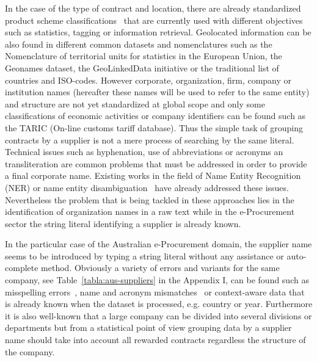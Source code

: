 \documentclass{llncs}
\begin{document}
In the case of the type of contract and location, there are already standardized product 
scheme classifications~\cite{DBLP:journals/ijseke/AlvarezLSASL12,pscsODBook} that are currently used with different objectives 
such as statistics, tagging or information retrieval. Geolocated information can be also found in different common datasets and nomenclatures such as 
the Nomenclature of territorial units for statistics in the European Union, the Geonames dataset, the GeoLinkedData 
initiative or the traditional list of countries and ISO-codes. However corporate, organization, firm, company or institution names (hereafter these names will be used to refer to 
the same entity) and structure are not yet standardized at global scope and only some classifications of economic activities or 
company identifiers can be found such as the TARIC (On-line customs tariff database). 
Thus the simple task of grouping contracts by a supplier is not a mere process of searching by the same literal. 
Technical issues such as hyphenation, use of abbreviations or acronyms an transliteration are common problems that must be addressed in order 
to provide a final corporate name. Existing works in the field of Name Entity Recognition~\cite{citeulike:1657521} (NER) or 
name entity disambiguation~\cite{Klein:2003:NER:1119176.1119204} have already addressed these issues. 
Nevertheless the problem that is being tackled in these approaches lies in the identification of organization names in 
a raw text while in the e-Procurement sector the string literal identifying a supplier is already known.

In the particular case of the Australian e-Procurement domain, the supplier name seems to be introduced by typing a string literal without any assistance or 
auto-complete method. Obviously a variety of errors and variants for the same company, see Table~\ref{tabla:aus-suppliers} in the Appendix I, 
can be found such as misspelling errors~\cite{NorvigSpelling}, name and acronym mismatches~\cite{Yeates99automaticextraction} 
or context-aware data that is already known when the dataset is processed, e.g. country or year. Furthermore it is also well-known 
that a large company can be divided into several divisions or departments but from a statistical point of view grouping data by a supplier name 
should take into account all rewarded contracts regardless the structure of the company.
\end{document}
